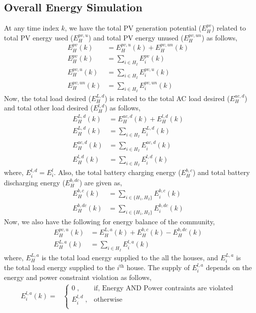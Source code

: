 \documentclass[11pt,usenames]{article}
\begin{document}
\subsection{Overall Energy Simulation}\label{subsection:OverallEnergySimulation}
At any time index $k$, we have the total PV generation potential ($E_{H}^{pv}$) related to total PV energy used ($E_{H}^{pv,u}$) and total PV energy unused ($E_{H}^{pv,un}$) as follows,
\begin{align}
	E_{H}^{pv}(k) &= E_{H}^{pv,u}(k)+E_{H}^{pv,un}(k) \\
	E_{H}^{pv}(k) &= \sum_{i \in H_{I}} E_{i}^{pv}(k) \\	
	E_{H}^{pv,u}(k) &= \sum_{i \in H_{I}} E_{i}^{pv,u}(k) \\
	E_{H}^{pv,un}(k) &= \sum_{i \in H_{I}} E_{i}^{pv,un}(k) 
\end{align}
Now, the total load desired ($E_{H}^{L,d}$) is related to the total AC load desired ($E_{H}^{ac,d}$) and total other load desired ($E_{H}^{l,d}$) as follows,
\begin{align}
	E_{H}^{L,d}(k) &= E_{H}^{ac,d}(k)+E_{H}^{l,d}(k) \\
	E_{H}^{L,d}(k) &= \sum_{i \in H_{I}} E_{i}^{L,d}(k) \\	
	E_{H}^{ac,d}(k) &= \sum_{i \in H_{I}} E_{i}^{ac,d}(k) \\
	E_{H}^{l,d}(k) &= \sum_{i \in H_{I}} E_{i}^{l,d}(k) 
\end{align}
where, $E_{i}^{l,d} =E_{i}^{l}$.
Also, the total battery charging energy ($E_{H}^{b,c}$) and total battery discharging energy ($E_{H}^{b,dc}$) are given as,
\begin{align}	
	E_{H}^{b,c}(k) &= \sum_{i \in \{H_{1},H_{2}\}} E_{i}^{b,c}(k) \\
	E_{H}^{b,dc}(k) &= \sum_{i \in \{H_{1},H_{2}\}} E_{i}^{b,dc}(k) 
\end{align}
Now, we also have the following for energy balance of the community,
\begin{align}	
	E_{H}^{pv,u}(k) &= E_{H}^{L,a}(k)+E_{H}^{b,c}(k)-E_{H}^{b,dc}(k)\\
	E_{H}^{L,a}(k) &= \sum_{i \in H_{I}} E_{i}^{l,a}(k) 
\end{align}
where, $E_{H}^{L,a}$ is the total load energy supplied to the all the houses, and $E_{i}^{L,a}$ is the total load energy supplied to the $i^{\text{th}}$ house. The supply of $E_{i}^{l,a}$ depends on the energy and power constraint violation as follows,
\begin{align}
	E_{i}^{l,a}(k)= & 
	\begin{cases}
		0 \; , & \text{if, Energy AND Power contraints are violated}  \\
		E_{i}^{l,d} \; , & \text{otherwise} \\
	\end{cases}
\end{align}
\end{document}
